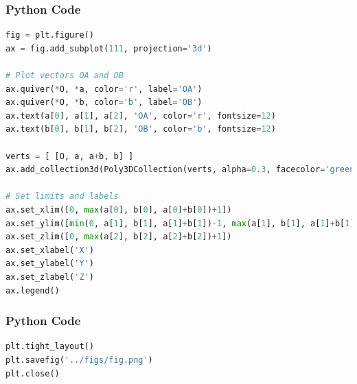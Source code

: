 \documentclass{beamer}
\begin{document}
\begin{frame}[fragile]
    \frametitle{Python Code}
    \begin{lstlisting}[language=Python]
fig = plt.figure()
ax = fig.add_subplot(111, projection='3d')

# Plot vectors OA and OB
ax.quiver(*O, *a, color='r', label='OA')
ax.quiver(*O, *b, color='b', label='OB')
ax.text(a[0], a[1], a[2], 'OA', color='r', fontsize=12)
ax.text(b[0], b[1], b[2], 'OB', color='b', fontsize=12)

verts = [ [O, a, a+b, b] ]
ax.add_collection3d(Poly3DCollection(verts, alpha=0.3, facecolor='green'))

# Set limits and labels
ax.set_xlim([0, max(a[0], b[0], a[0]+b[0])+1])
ax.set_ylim([min(0, a[1], b[1], a[1]+b[1])-1, max(a[1], b[1], a[1]+b[1])+1])
ax.set_zlim([0, max(a[2], b[2], a[2]+b[2])+1])
ax.set_xlabel('X')
ax.set_ylabel('Y')
ax.set_zlabel('Z')
ax.legend()


\end{lstlisting}
\end{frame}




\begin{frame}[fragile]
    \frametitle{Python Code}
    \begin{lstlisting}[language=Python]
plt.tight_layout()
plt.savefig('../figs/fig.png')
plt.close()
\end{lstlisting}
\end{frame}
\end{document}

